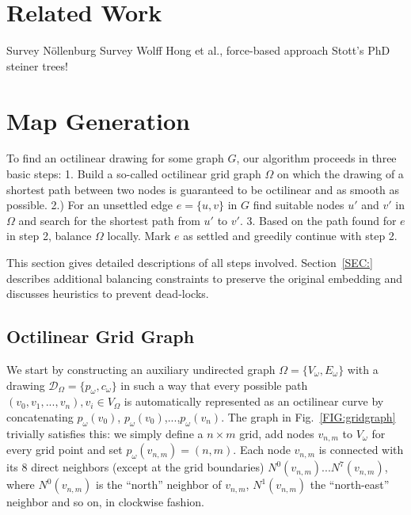 \documentclass{sig-alternate-sigmod09}
\begin{document}
\section{Related Work}

Survey Nöllenburg %
Survey Wolff %
Hong et al., force-based approach
Stott's PhD
steiner trees! %

\section{Map Generation}

To find an octilinear drawing for some graph $G$, our algorithm proceeds in three basic steps: 1. Build a so-called octilinear grid graph $\Omega$ on which the drawing of a shortest path between two nodes is guaranteed to be octilinear and as smooth as possible. 2.) For an unsettled edge $e = \{u, v\}$ in $G$ find suitable nodes $u'$ and $v'$ in $\Omega$ and search for the shortest path from $u'$ to $v'$. 3. Based on the path found for $e$ in step 2, balance $\Omega$ locally. Mark $e$ as settled and greedily continue with step 2.

This section gives detailed descriptions of all steps involved. Section~\ref{SEC:} describes additional balancing constraints to preserve the original embedding and discusses heuristics to prevent dead-locks.

\subsection{Octilinear Grid Graph}

We start by constructing an auxiliary undirected graph $\Omega = \{V_\omega, E_\omega\}$ with a drawing $\mathcal{D}_\Omega = \{p_\omega, c_\omega\}$ in such a way that every possible path $(v_0, v_1, ..., v_n), v_i \in V_\Omega$ is automatically represented as an octilinear curve by concatenating $p_\omega(v_0)$, $p_\omega(v_0)$,$...$,$p_\omega(v_n)$. The graph in Fig.~\ref{FIG:gridgraph} trivially satisfies this: we simply define a $n\times m$ grid, add nodes $v_{n,m}$ to $V_\omega$ for every grid point and set $p_\omega(v_{n,m}) = (n, m)$. Each node $v_{n,m}$ is connected with its 8 direct neighbors (except at the grid boundaries) $N^0(v_{n,m}) ... N^7(v_{n, m})$, where $N^0(v_{n,m})$ is the ``north'' neighbor of $v_{n, m}$,  $N^1(v_{n,m})$ the ``north-east'' neighbor and so on, in clockwise fashion.
\end{document}
